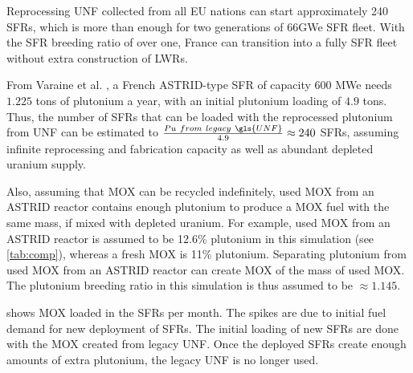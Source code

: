 Reprocessing \gls{UNF} collected from all EU nations can start approximately
240 \glspl{SFR}, which is more than enough for two generations of 66GWe \gls{SFR}
fleet. With the \gls{SFR} breeding ratio of over one, France can transition into
a fully \gls{SFR} fleet without extra construction of \glspl{LWR}. 

From Varaine et al. \cite{varaine_pre-conceptual_2012}, a French
ASTRID-type \gls{SFR} of capacity 600 \gls{MWe} needs $1.225$ tons of
plutonium a year, with an initial plutonium loading of $4.9$ tons. 
Thus, the number of \glspl{SFR} that can be loaded with the reprocessed
plutonium from \gls{UNF} can be estimated to $\frac{Pu \ from \ legacy \ \gls{UNF}}{4.9} \approx 240$ \glspl{SFR},
assuming infinite reprocessing and fabrication capacity as well as
abundant depleted uranium supply. 

Also, assuming that \gls{MOX} can be recycled indefinitely,
used \gls{MOX} from an ASTRID reactor contains enough plutonium to produce a \gls{MOX} fuel with
the same mass, if mixed with depleted uranium. For example,
used \gls{MOX} from an ASTRID reactor is assumed to be 12.6\% plutonium
in this simulation (see \cref{tab:comp}), whereas a fresh \gls{MOX} is 11\% plutonium.
Separating plutonium from used \gls{MOX} from
an ASTRID reactor can create \gls{MOX} of the mass of used \gls{MOX}.
The plutonium breeding ratio in this simulation is thus assumed to be
$\approx 1.145$.

 shows \gls{MOX} loaded in the \glspl{SFR} per month.
The spikes are due to initial fuel demand for new deployment of \glspl{SFR}.
The initial loading of new \glspl{SFR} are done with the \gls{MOX} created
from legacy \gls{UNF}. Once the deployed \glspl{SFR} create enough amounts
 of extra plutonium, the legacy \gls{UNF} is no longer used. 

